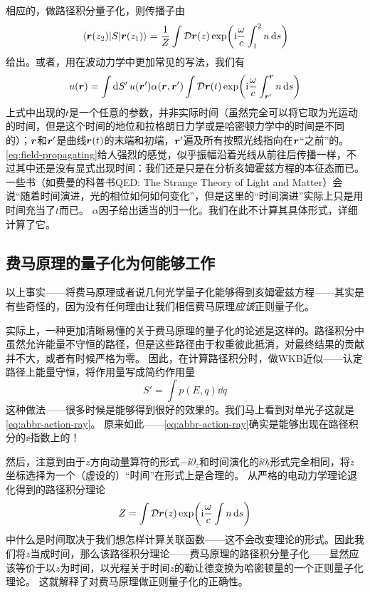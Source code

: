 相应的，做路径积分量子化，则传播子由
\begin{equation}
    \mel{\vb*{r}(z_2)}{S}{\vb*{r}(z_1)} = \frac{1}{Z} \int \mathcal{D} {\vb*{r}(z)} \exp(\mathrm{i} \frac{\omega}{c} \int_1^2 n \dd{s})
\end{equation}
给出。或者，用在波动力学中更加常见的写法，我们有
\begin{equation}
    u(\vb*{r}) = \int \dd{S'} u(\vb*{r}') \alpha(\vb*{r}, \vb*{r}') \int \mathcal{D} {\vb*{r}(t)} \exp(\mathrm{i} \frac{\omega}{c} \int_{\vb*{r}'}^{\vb*{r}} n \dd{s})
    \label{eq:field-propagating}
\end{equation}
上式中出现的$t$是一个任意的参数，并非实际时间（虽然完全可以将它取为光运动的时间，但是这个时间的地位和拉格朗日力学或是哈密顿力学中的时间是不同的）；$\vb*{r}$和$\vb*{r}'$是曲线$\vb*{r}(t)$的末端和初端，$\vb*{r}'$遍及所有按照光线指向在$\vb*{r}$“之前”的。
\eqref{eq:field-propagating}给人强烈的感觉，似乎振幅沿着光线从前往后传播一样，不过其中还是没有显式出现时间：我们还是只是在分析亥姆霍兹方程的本征态而已。
一些书（如费曼的科普书QED: The Strange Theory of Light and Matter）会说“随着时间演进，光的相位如何如何变化”，但是这里的“时间演进”实际上只是用时间充当了$t$而已。
$\alpha$因子给出适当的归一化。我们在此不计算其具体形式，\cite{Gitin_2013}详细计算了它。

\subsection{费马原理的量子化为何能够工作}

以上事实——将费马原理或者说几何光学量子化能够得到亥姆霍兹方程——其实是有些奇怪的，因为没有任何理由让我们相信费马原理\emph{应该}正则量子化。

实际上，一种更加清晰易懂的关于费马原理的量子化的论述是这样的。路径积分中虽然允许能量不守恒的路径，但是这些路径由于权重彼此抵消，对最终结果的贡献并不大，或者有时候严格为零。
因此，在计算路径积分时，做WKB近似——认定路径上能量守恒，将作用量写成简约作用量
\begin{equation}
    S' = \int p(E, q) \dd{q}
\end{equation}
这种做法——很多时候是能够得到很好的效果的。我们马上看到对单光子这就是\eqref{eq:abbr-action-ray}。
原来如此——\eqref{eq:abbr-action-ray}确实是能够出现在路径积分的$\ee$指数上的！

然后，注意到由于$z$方向动量算符的形式$- \ii \partial_z$和时间演化的$\ii \partial_t$形式完全相同，将$z$坐标选择为一个（虚设的）“时间”在形式上是合理的。
从严格的电动力学理论退化得到的路径积分理论
\[
    Z = \int \mathcal{D}\vb*{r}(z) \exp(\mathrm{i} \frac{\omega}{c} \int n \dd{s})
\]
中什么是时间取决于我们想怎样计算关联函数——这不会改变理论的形式。因此我们将$z$当成时间，那么该路径积分理论——费马原理的路径积分量子化——显然应该等价于以$z$为时间，以光程关于时间$z$的勒让德变换为哈密顿量的一个正则量子化理论。
这就解释了对费马原理做正则量子化的正确性。

